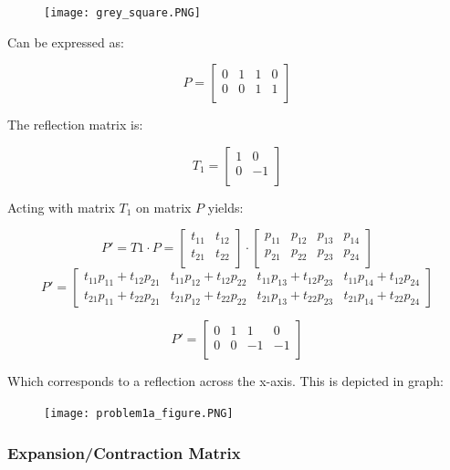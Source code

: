 \documentclass{article}
\begin{document}
\begin{figure}[!htb]
  \centering
  \texttt{[image: grey\_square.PNG]}
  \label{fig3}
\end{figure}

Can be expressed as:

\[P = 
\begin{bmatrix}
    0 & 1 & 1 & 0 \\
    0 & 0 & 1 & 1 \\
\end{bmatrix}
\]

The reflection matrix is:

\[T_{1} = 
\begin{bmatrix}
    1 & 0  \\
    0 & -1  \\
\end{bmatrix}
\]

Acting with matrix $T_1$ on matrix $P$ yields:

\[ 
P' = T1 \cdot P = \begin{bmatrix}
t_{11} & t_{12} \\
t_{21} & t_{22} \\
\end{bmatrix} \cdot \begin{bmatrix}
p_{11} & p_{12} & p_{13} & p_{14} \\
p_{21} & p_{22} & p_{23} & p_{24} \\
\end{bmatrix}
\]
\[P' =  
\begin{bmatrix}
    t_{11}p_{11} + t_{12}p_{21} & t_{11}p_{12} + t_{12}p_{22} & t_{11}p_{13} + t_{12}p_{23} & t_{11}p_{14} + t_{12}p_{24} \\
    t_{21}p_{11} + t_{22}p_{21} & t_{21}p_{12} + t_{22}p_{22} & t_{21}p_{13} + t_{22}p_{23} & t_{21}p_{14} + t_{22}p_{24}
\end{bmatrix}
\]

\[P' = 
\begin{bmatrix}
    0 & 1 & 1 & 0 \\
    0 & 0 & -1 & -1 \\
\end{bmatrix}
\]

Which corresponds to a reflection across the x-axis. This is depicted in graph:

\begin{figure}
  \centering
  \texttt{[image: problem1a\_figure.PNG]}
  \label{fig3}
\end{figure}

\subsubsection*{Expansion/Contraction Matrix}
\end{document}
